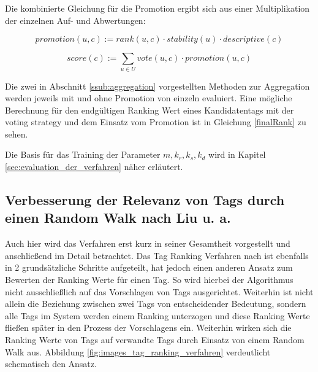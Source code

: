 Die kombinierte Gleichung für die Promotion ergibt sich aus einer Multiplikation der einzelnen Auf- und Abwertungen:
\begin{figure}[!hptb]
 \begin{equation}
 \label{combinedPromotion}
    promotion(u, c) := rank(u, c) \cdot stability(u) \cdot descriptive(c)
 \end{equation}
\end{figure}

\begin{figure}[!hptb]
 \begin{equation}
 \label{finalRank}
    score(c) :=  \sum_{u \in U} vote(u, c) \cdot promotion(u, c)
 \end{equation}
\end{figure}

Die zwei in Abschnitt \ref{ssub:aggregation} vorgestellten Methoden zur Aggregation werden jeweils mit und ohne Promotion von \cite{collectiveKnowledge} einzeln evaluiert. Eine mögliche Berechnung für den endgültigen Ranking Wert eines Kandidatentags mit der voting strategy und dem Einsatz vom Promotion ist in Gleichung \ref{finalRank} zu sehen.




Die Basis für das Training der Parameter $m,	k_r,	k_s, k_d$ wird in Kapitel \ref{sec:evaluation_der_verfahren} näher erläutert. 


\subsection{Verbesserung der Relevanz von Tags durch einen Random Walk nach Liu u. a.} %
\label{sub:verbesserung_der_relevanz_durch_einen_random_walk}

Auch hier wird das Verfahren erst kurz in seiner Gesamtheit vorgestellt und anschließend im Detail betrachtet.
Das Tag Ranking Verfahren nach \cite{ranking} ist ebenfalls in 2 grundsätzliche Schritte aufgeteilt, hat jedoch einen anderen Ansatz zum Bewerten der Ranking Werte für einen Tag. So wird hierbei der Algorithmus nicht ausschließlich auf das Vorschlagen von Tags ausgerichtet. Weiterhin ist nicht allein die Beziehung zwischen zwei Tags von entscheidender Bedeutung, sondern alle Tags im System werden einem Ranking unterzogen und diese Ranking Werte fließen später in den Prozess der Vorschlagens ein. Weiterhin wirken sich die Ranking Werte von Tags auf verwandte Tags durch Einsatz von einem Random Walk aus. Abbildung \ref{fig:images_tag_ranking_verfahren} verdeutlicht schematisch den Ansatz.

